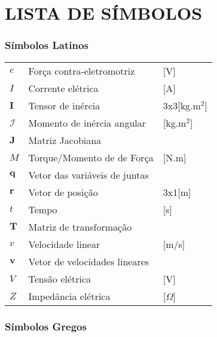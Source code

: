 




\chapter*{LISTA DE SÍMBOLOS}




\subsection*{Símbolos Latinos}

\begin{tabular}{p{}p{}>{\PreserveBacklash\raggedleft}p{}}
$e$             & Força contra-eletromotriz     & {[}V{]}           \tabularnewline    
$I$             & Corrente elétrica             & {[}A{]}           \tabularnewline 
$\textbf{I}$    & Tensor de inércia             & 3x3{[}kg.m$^2${]} \tabularnewline
$\mathcal{I}$   & Momento de inércia angular    & {[}kg.m$^2${]}    \tabularnewline
$\textbf{J}$    & Matriz Jacobiana              &                   \tabularnewline
$M$             & Torque/Momento de de Força    & {[}N.m{]}         \tabularnewline
$\textbf{q}$    & Vetor das variáveis de juntas &                   \tabularnewline
$\textbf{r}$    & Vetor de posição              & 3x1{[}m{]}        \tabularnewline
$t$             & Tempo                         & {[}s{]}           \tabularnewline
$\textbf{T}$    & Matriz de transformação       &                   \tabularnewline
$v$             & Velocidade linear             & {[}m/s{]}         \tabularnewline
$\textbf{v}$    & Vetor de velocidades lineares &                   \tabularnewline
$V$             & Tensão elétrica               & {[}V{]}           \tabularnewline
$Z$             & Impedância elétrica           & {[}$\Omega${]}    \tabularnewline 
\end{tabular}


\subsection*{Símbolos Gregos}

